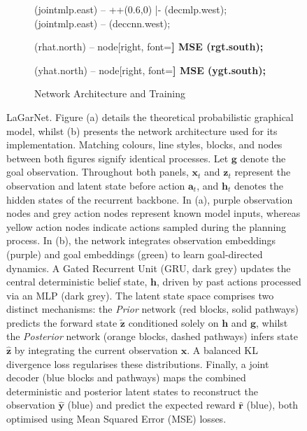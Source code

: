 \documentclass[journal]{IEEEtran}
\begin{document}
\begin{figure}[t!]
\begin{subfigure}[t]{0.98\linewidth}
{    %
     (jointmlp.east) -- ++(0.6,0) |- (decmlp.west);
     (jointmlp.east) -- (deccnn.west);

     (rhat.north) -- node[right, font=\bfseries] {MSE} (rgt.south);

     (yhat.north) -- node[right, font=\bfseries] {MSE} (ygt.south);
}
        \caption{Network Architecture and Training}
        \label{fig:network}
    \end{subfigure}
    \caption{LaGarNet. Figure (a) details the theoretical probabilistic graphical model, whilst (b) presents the network architecture used for its implementation. Matching colours, line styles, blocks, and nodes between both figures signify identical processes. Let $\bm{g}$ denote the goal observation. Throughout both panels, $\bm{x}_t$ and $\bm{z}_t$ represent the observation and latent state before action $\bm{a}_t$, and $\bm{h}_t$ denotes the hidden states of the recurrent backbone. In (a), purple observation nodes and grey action nodes represent known model inputs, whereas yellow action nodes indicate actions sampled during the planning process. In (b), the network integrates observation embeddings (purple) and goal embeddings (green) to learn goal-directed dynamics. A Gated Recurrent Unit (GRU, dark grey) updates the central deterministic belief state, $\boldsymbol{h}$, driven by past actions processed via an MLP (dark grey). The latent state space comprises two distinct mechanisms: the \textit{Prior} network (red blocks, solid pathways) predicts the forward state $\boldsymbol{\tilde{z}}$ conditioned solely on $\boldsymbol{h}$ and $\boldsymbol{g}$, whilst the \textit{Posterior} network (orange blocks, dashed pathways) infers state $\boldsymbol{\hat{z}}$ by integrating the current observation $\boldsymbol{x}$. A balanced KL divergence loss regularises these distributions. Finally, a joint decoder (blue blocks and pathways) maps the combined deterministic and posterior latent states to reconstruct the observation $\boldsymbol{\hat{y}}$ (blue) and predict the expected reward $\boldsymbol{\hat{r}}$ (blue), both optimised using Mean Squared Error (MSE) losses.}
    \label{fig:lagarnet}
\end{figure}
\end{document}
